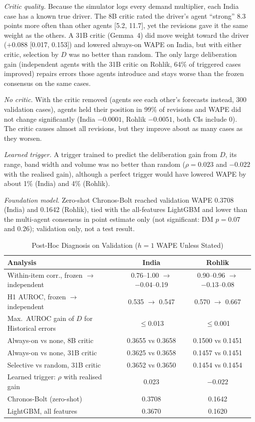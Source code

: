 \documentclass[conference]{IEEEtran}
\begin{document}
\emph{Critic quality.} Because the simulator logs every demand multiplier, each India case has a
known true driver. The 8B critic rated the driver's agent ``strong'' 8.3 points more often than other
agents [5.2, 11.7], yet the revisions gave it the same weight as the others. A 31B critic (Gemma~4)
did move weight toward the driver ($+0.088$ [0.017, 0.153]) and lowered always-on WAPE on India,
but with either critic, selection by $D$ was no better than random. The only large deliberation gain
(independent agents with the 31B critic on Rohlik, 64\% of triggered cases improved) repairs errors
those agents introduce and stays worse than the frozen consensus on the same cases.

\emph{No critic.} With the critic removed (agents see each other's forecasts instead, 300 validation
cases), agents held their position in 99\% of revisions and WAPE did not change significantly (India
$-0.0001$, Rohlik $-0.0051$, both CIs include 0). The critic causes almost all revisions, but
they improve about as many cases as they worsen.

\emph{Learned trigger.} A trigger trained to predict the deliberation gain from $D$, its range, band
width and volume was no better than random ($\rho=0.023$ and $-0.022$ with the realised gain),
although a perfect trigger would have lowered WAPE by about 1\% (India) and 4\% (Rohlik).

\emph{Foundation model.} Zero-shot Chronos-Bolt reached validation WAPE 0.3708 (India) and 0.1642
(Rohlik), tied with the all-features LightGBM and lower than the multi-agent consensus in point
estimate only (not significant: DM $p=0.07$ and $0.26$); validation only, not a test result.

\begin{table}[t]
\caption{Post-Hoc Diagnosis on Validation ($h=1$ WAPE Unless Stated)}
\label{tab:diagnosis}
\centering
\scriptsize
\setlength{\tabcolsep}{3pt}
\begin{tabularx}{\columnwidth}{@{}Xcc@{}}
\toprule
Analysis & India & Rohlik \\
\midrule
Within-item corr., frozen $\rightarrow$ independent & 0.76--1.00 $\rightarrow$ $-0.04$--0.19 & 0.90--0.96 $\rightarrow$ $-0.13$--0.08 \\
H1 AUROC, frozen $\rightarrow$ independent & 0.535 $\rightarrow$ 0.547 & 0.570 $\rightarrow$ 0.667 \\
Max.\ AUROC gain of $D$ for Historical errors & $\le$0.013 & $\le$0.001 \\
\midrule
Always-on vs none, 8B critic & 0.3655 vs 0.3658 & 0.1500 vs 0.1451 \\
Always-on vs none, 31B critic & 0.3625 vs 0.3658 & 0.1457 vs 0.1451 \\
Selective vs random, 31B critic & 0.3652 vs 0.3650 & 0.1454 vs 0.1454 \\
\midrule
Learned trigger: $\rho$ with realised gain & 0.023 & $-0.022$ \\
Chronos-Bolt (zero-shot) & 0.3708 & 0.1642 \\
LightGBM, all features & 0.3670 & 0.1620 \\
\bottomrule
\end{tabularx}
\end{table}
\end{document}
